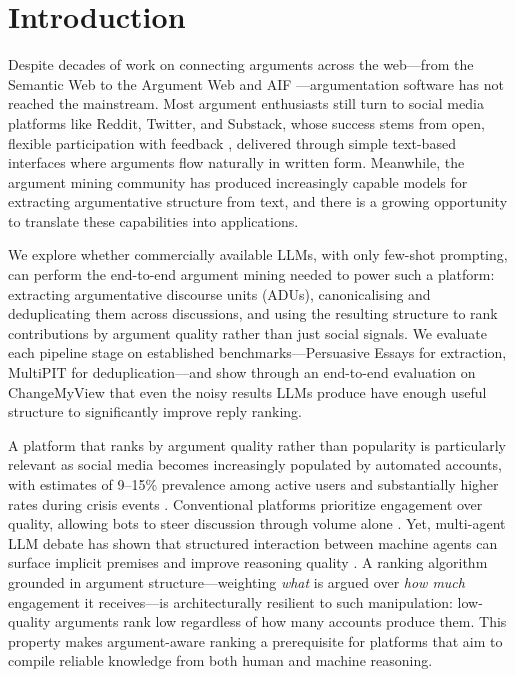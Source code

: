 \section{Introduction}

Despite decades of work on connecting arguments across the web---from the Semantic Web \citep{Berners-Lee:2001} to the Argument Web \citep{Bex:2013} and AIF \citep{Chesnevar:2007:AIF}---argumentation software has not reached the mainstream. Most argument enthusiasts still turn to social media platforms like Reddit, Twitter, and Substack, whose success stems from open, flexible participation with feedback \citep{Leite2011}, delivered through simple text-based interfaces where arguments flow naturally in written form. Meanwhile, the argument mining community has produced increasingly capable models for extracting argumentative structure from text, and there is a growing opportunity to translate these capabilities into applications.

We explore whether commercially available LLMs, with only few-shot prompting, can perform the end-to-end argument mining needed to power such a platform: extracting argumentative discourse units (ADUs), canonicalising and deduplicating them across discussions, and using the resulting structure to rank contributions by argument quality rather than just social signals. We evaluate each pipeline stage on established benchmarks---Persuasive Essays \citep{stab-gurevych-2014-annotating} for extraction, MultiPIT \citep{dou-etal-2022-improving} for deduplication---and show through an end-to-end evaluation on ChangeMyView \citep{Kolyada2020} that even the noisy results LLMs produce have enough useful structure to significantly improve reply ranking.

A platform that ranks by argument quality rather than popularity is particularly relevant as social media becomes increasingly populated by automated accounts, with estimates of 9--15\% prevalence among active users \citep{varol2017online} and substantially higher rates during crisis events \citep{elayan2024digital}. Conventional platforms prioritize engagement over quality, allowing bots to steer discussion through volume alone \citep{farcas2025manufacturing}. Yet, multi-agent LLM debate has shown that structured interaction between machine agents can surface implicit premises and improve reasoning quality \citep{ku2025multiagent}. A ranking algorithm grounded in argument structure---weighting \emph{what} is argued over \emph{how much} engagement it receives---is architecturally resilient to such manipulation: low-quality arguments rank low regardless of how many accounts produce them. This property makes argument-aware ranking a prerequisite for platforms that aim to compile reliable knowledge from both human and machine reasoning.

